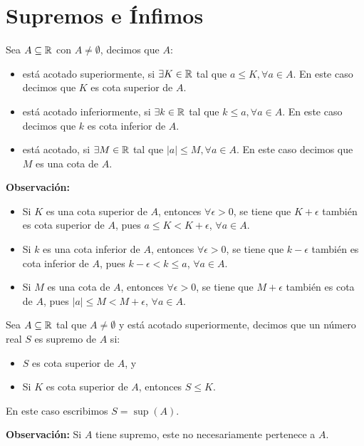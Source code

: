 \part*{Supremos e Ínfimos}

 Sea $A\subseteq \mathbb{R}$ con $A\neq \emptyset$, decimos que $A$:
\begin{itemize}
 \item está acotado superiormente, si $\exists K\in \mathbb{R}$ tal que $a \leq K, \forall a\in A$. En este caso decimos que $K$ es cota superior de $A$.

 \item está acotado inferiormente, si $\exists k\in \mathbb{R}$ tal que $k \leq a, \forall a\in A$. En este caso decimos que $k$ es cota inferior de $A$.

 \item está acotado, si $\exists M\in \mathbb{R}$ tal que $|a|\leq M,\forall a \in A$. En este caso decimos que $M$ es una cota de $A$.
\end{itemize}

\textbf{Observación:}
\begin{itemize}
  \item Si $K$ es una cota superior de $A$, entonces $\forall \epsilon>0$, se tiene que $K+\epsilon$ también es cota superior de $A$, pues $a \leq K<K+\epsilon$, $\forall a\in A$. 
  \item Si $k$ es una cota inferior de $A$, entonces $\forall \epsilon>0$, se tiene que $k - \epsilon$ también es cota inferior de $A$, pues $k - \epsilon < k \leq a$, $\forall a\in A$.
  \item Si $M$ es una cota de $A$, entonces $\forall \epsilon>0$, se tiene que $M+\epsilon$ también es cota de $A$, pues $|a|\leq M < M+\epsilon$, $\forall a\in A$.
\end{itemize}

  Sea $A\subseteq \mathbb{R}$ tal que $A\neq \emptyset$ y está acotado superiormente, decimos que un número real $S$ es supremo de $A$ si:
\begin{itemize}
 \item $S$ es cota superior de $A$, y
 \item Si $K$ es cota superior de $A$, entonces $S\leq K$.%
\end{itemize}

En este caso escribimos $S=\sup(A)$.

\textbf{Observación:} Si $A$ tiene supremo, este no necesariamente pertenece a $A$.

